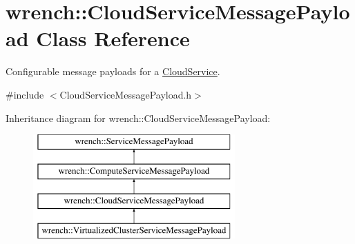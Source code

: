 \hypertarget{classwrench_1_1_cloud_service_message_payload}{}\section{wrench\+:\+:Cloud\+Service\+Message\+Payload Class Reference}
\label{classwrench_1_1_cloud_service_message_payload}


Configurable message payloads for a \hyperlink{classwrench_1_1_cloud_service}{Cloud\+Service}.  




{\ttfamily \#include $<$Cloud\+Service\+Message\+Payload.\+h$>$}

Inheritance diagram for wrench\+:\+:Cloud\+Service\+Message\+Payload\+:\begin{figure}[H]
\begin{center}
\leavevmode
\includegraphics[height=4.000000cm]{classwrench_1_1_cloud_service_message_payload}
\end{center}
\end{figure}
